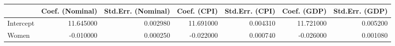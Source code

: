 \begin{tabular}{lrrrrrr}
\toprule
 & Coef. (Nominal) & Std.Err. (Nominal) & Coef. (CPI) & Std.Err. (CPI) & Coef. (GDP) & Std.Err. (GDP) \\
\midrule
Intercept & 11.645000 & 0.002980 & 11.691000 & 0.004310 & 11.721000 & 0.005200 \\
Women & -0.010000 & 0.000250 & -0.022000 & 0.000740 & -0.026000 & 0.001080 \\
\bottomrule
\end{tabular}
